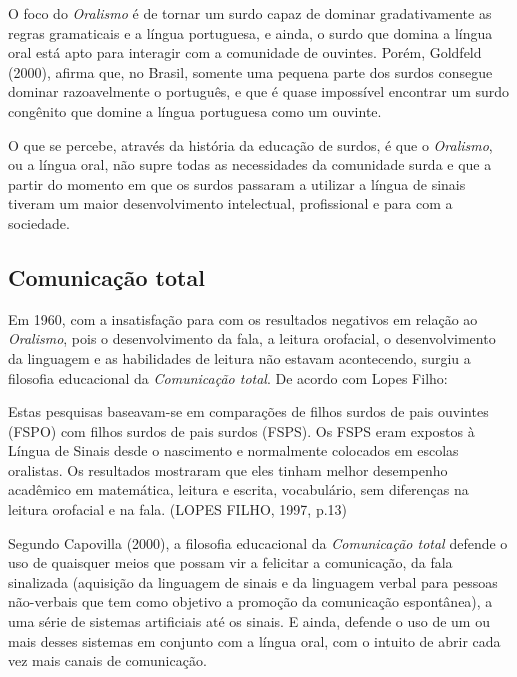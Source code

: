 \documentclass[brasil]{abnt}
\begin{document}
		O foco do \textit{Oralismo} é de tornar um surdo capaz de dominar gradativamente as regras gramaticais e a língua portuguesa, e ainda, o surdo que domina a língua oral está apto para interagir com 
		a comunidade de ouvintes. Porém, Goldfeld (2000), afirma que, no Brasil, somente uma pequena parte dos surdos consegue dominar razoavelmente o português, e que é quase impossível encontrar um surdo 
		congênito que domine a língua portuguesa como um ouvinte.
		
		O que se percebe, através da história da educação de surdos, é que o \textit{Oralismo}, ou a língua oral, não supre todas as necessidades da comunidade surda e que a partir do momento em que os surdos 
		passaram a utilizar a língua de sinais tiveram um maior desenvolvimento intelectual, profissional e para com a sociedade.		 		 
		 
		\subsection{Comunicação total}
		Em 1960, com a insatisfação para com os resultados negativos em relação ao \textit{Oralismo}, pois o desenvolvimento da fala, a leitura orofacial, o desenvolvimento da linguagem e as habilidades de 
		leitura não estavam acontecendo, surgiu a filosofia educacional da \textit{Comunicação total}. De acordo com Lopes Filho:
		
			\begin{citacao} Estas pesquisas baseavam-se em comparações de filhos surdos de pais ouvintes (FSPO) com filhos surdos de pais surdos (FSPS). Os FSPS eram expostos à Língua de Sinais desde o 
							nascimento e normalmente colocados em escolas oralistas. Os resultados mostraram que eles tinham melhor desempenho acadêmico em matemática, leitura e escrita, vocabulário, sem 
							diferenças na leitura orofacial e na fala. (LOPES FILHO, 1997, p.13)
			\end{citacao}
		  
		 Segundo Capovilla (2000), a filosofia educacional da \textit{Comunicação total} defende o uso de quaisquer meios que possam vir a felicitar a comunicação, da fala sinalizada (aquisição da linguagem 
		 de sinais e da linguagem verbal para pessoas não-verbais que tem como objetivo a promoção da comunicação espontânea), a uma série de sistemas artificiais até os sinais. E ainda, defende o uso de um 
		 ou mais desses sistemas em conjunto com a língua oral, com o intuito de abrir cada vez mais canais de comunicação.
		 
\end{document}
